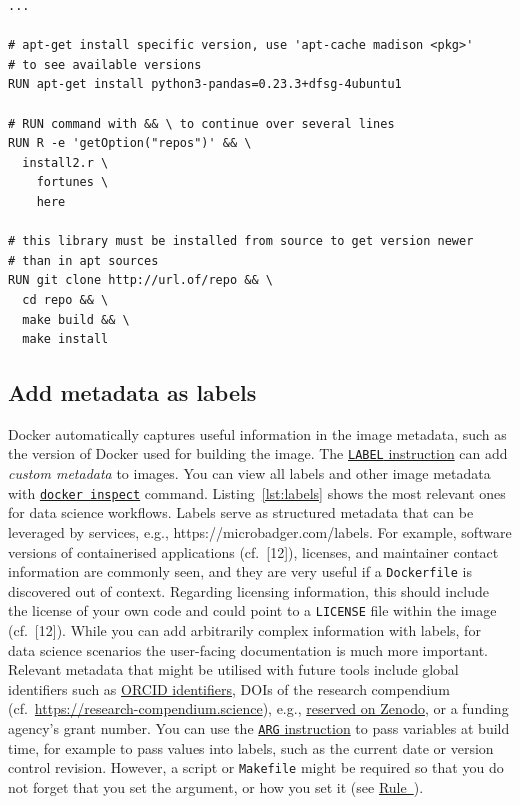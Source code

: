 \documentclass[10pt,letterpaper]{article}
\begin{document}
\begin{minipage}{\linewidth}

\begin{lstlisting}[language=docker,caption={Partial \texttt{Dockerfile} with examples for helpful comments.},breaklines=true,label={lst:comments}]
...

# apt-get install specific version, use 'apt-cache madison <pkg>' 
# to see available versions
RUN apt-get install python3-pandas=0.23.3+dfsg-4ubuntu1

# RUN command with && \ to continue over several lines
RUN R -e 'getOption("repos")' && \
  install2.r \
    fortunes \
    here

# this library must be installed from source to get version newer
# than in apt sources
RUN git clone http://url.of/repo && \
  cd repo && \
  make build && \
  make install
\end{lstlisting}

\end{minipage}

\normalsize

\hypertarget{add-metadata-as-labels}{%
\subsection{Add metadata as labels}\label{add-metadata-as-labels}}

Docker automatically captures useful information in the image metadata,
such as the version of Docker used for building the image. The
\href{https://docs.docker.com/engine/reference/builder/\#label}{\texttt{LABEL}
instruction} can add \emph{custom metadata} to images. You can view all
labels and other image metadata with
\href{https://docs.docker.com/engine/reference/commandline/inspect/}{\texttt{docker\ inspect}}
command. Listing~\ref{lst:labels} shows the most relevant ones for data
science workflows. Labels serve as structured metadata that can be
leveraged by services, e.g., https://microbadger.com/labels. For
example, software versions of containerised applications (cf.~{[}12{]}),
licenses, and maintainer contact information are commonly seen, and they
are very useful if a \texttt{Dockerfile} is discovered out of context.
Regarding licensing information, this should include the license of your
own code and could point to a \texttt{LICENSE} file within the image
(cf.~{[}12{]}). While you can add arbitrarily complex information with
labels, for data science scenarios the user-facing documentation is much
more important. Relevant metadata that might be utilised with future
tools include global identifiers such as \href{https://orcid.org/}{ORCID
identifiers}, DOIs of the research compendium
(cf.~\url{https://research-compendium.science}), e.g.,
\href{https://help.zenodo.org/}{reserved on Zenodo}, or a funding
agency's grant number. You can use the
\href{https://docs.docker.com/engine/reference/builder/\#arg}{\texttt{ARG}
instruction} to pass variables at build time, for example to pass values
into labels, such as the current date or version control revision.
However, a script or \texttt{Makefile} might be required so that you do
not forget that you set the argument, or how you set it (see
\hyperref[{rule:usage}]{Rule~}).
\end{document}
